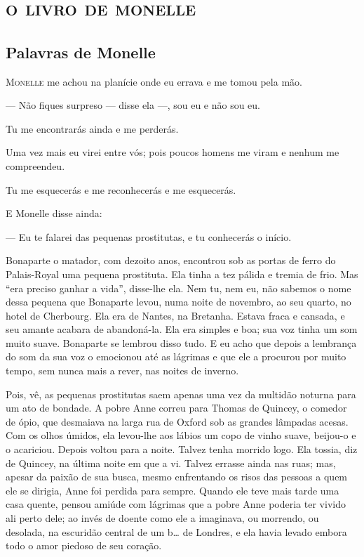\part{\textsc{o livro de monelle}}

\chapter{Palavras de Monelle}  

\textsc{Monelle} me achou na planície onde eu errava e me tomou pela mão.

--- Não fiques surpreso --- disse ela ---, sou eu e não sou eu.

Tu me encontrarás ainda e me perderás.

Uma vez mais eu virei entre vós; pois poucos homens me viram e nenhum
me compreendeu.

Tu me esquecerás e me reconhecerás e me esquecerás.

E Monelle disse ainda: 

--- Eu te falarei das pequenas prostitutas, e tu conhecerás o início.

Bonaparte o matador, com dezoito anos, encontrou sob as portas de ferro
do Palais-Royal uma pequena prostituta. Ela tinha a tez pálida e tremia de
frio. Mas “era preciso ganhar a vida”, disse-lhe ela. Nem tu, nem eu, não
sabemos o nome dessa pequena que Bonaparte levou, numa noite de novembro,
ao seu quarto, no hotel de Cherbourg. Ela era de Nantes, na Bretanha.
Estava fraca e cansada, e seu amante acabara de abandoná-la. Ela era
simples e boa; sua voz tinha um som muito suave. Bonaparte se lembrou disso
tudo. E eu acho que depois a lembrança do som da sua voz o emocionou até
as lágrimas e que ele a procurou por muito tempo, sem nunca mais a rever,
nas noites de inverno.

Pois, vê, as pequenas prostitutas saem apenas uma vez da multidão
noturna para um ato de bondade. A pobre Anne correu para Thomas de
Quincey, o comedor de ópio, que desmaiava na larga rua de Oxford sob as
grandes lâmpadas acesas. Com os olhos úmidos, ela levou-lhe aos lábios um
copo de vinho suave, beijou-o e o acariciou. Depois voltou para a noite.
Talvez tenha morrido logo. Ela tossia, diz de Quincey, na última noite em
que a vi. Talvez errasse ainda nas ruas; mas, apesar da paixão de sua
busca, mesmo enfrentando os risos das pessoas a quem ele se dirigia, Anne
foi perdida para sempre. Quando ele teve mais tarde uma casa quente, pensou
amiúde com lágrimas que a pobre Anne poderia ter vivido ali perto
dele; ao invés de doente como ele a imaginava, ou morrendo, ou desolada,
na escuridão central de um b\ldots{} de Londres, e ela havia levado 
embora todo o amor piedoso de seu coração.

